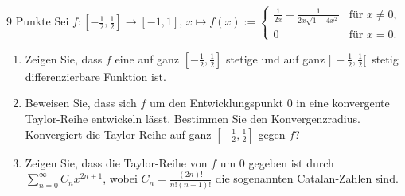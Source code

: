\documentclass{problemset}
\author{Michael van Straten}
\begin{document}
\maketitle

\begin{problem}{9 Punkte}
Sei $f : \left[-\frac{1}{2}, \frac{1}{2}\right] \to [-1, 1]$, $x \mapsto f(x) := \begin{cases} \frac{1}{2x} - \frac{1}{2x\sqrt{1 - 4x^2}} & \text{für } x \neq 0, \\ 0 & \text{für } x = 0. \end{cases}$
\begin{enumerate}
    \item Zeigen Sie, dass $f$ eine auf ganz $\left[-\frac{1}{2},
                  \frac{1}{2}\right]$ stetige und auf ganz $]\,-\frac{1}{2},
              \frac{1}{2}[\,$ stetig differenzierbare Funktion ist.
    \item Beweisen Sie, dass sich $f$ um den Entwicklungspunkt 0 in eine
          konvergente Taylor-Reihe entwickeln lässt. Bestimmen Sie den
          Konvergenzradius. Konvergiert die Taylor-Reihe auf ganz
          $\left[-\frac{1}{2}, \frac{1}{2}\right]$ gegen $f$?
    \item Zeigen Sie, dass die Taylor-Reihe von $f$ um 0 gegeben ist durch
          $\sum_{n=0}^{\infty} C_n x^{2n+1}$, wobei $C_n =
              \frac{(2n)!}{n!(n+1)!}$ die sogenannten Catalan-Zahlen sind.
\end{enumerate}
\end{problem}
\end{document}
